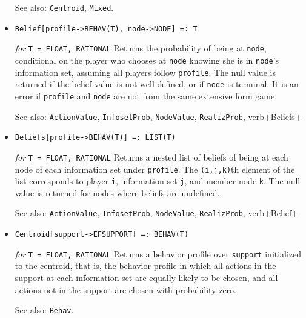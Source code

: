 \begin{itemize}
{\it for} {\tt T = FLOAT, RATIONAL}
\bd
Returns a behavior strategy profile over \verb+support+ with the
values specified by \verb+value+.  It is an error if the dimensions of
\verb+value+ do not match those of \verb+support+.
\item [See also:] \verb+Centroid+, \verb+Mixed+.
\ed

\item{}
\protect \large \begin{verbatim}
Belief[profile->BEHAV(T), node->NODE] =: T
\end{verbatim}\normalsize

{\it for} {\tt T = FLOAT, RATIONAL}
\bd
Returns the probability of being at \verb+node+, conditional on the
player who chooses at \verb+node+ knowing she is in \verb+node+'s
information set, assuming all players follow \verb+profile+.  The null
value is returned if the belief value is not well-defined, or if
\verb+node+ is terminal.  It is an error if \verb+profile+ and \verb+node+
are not from the same extensive form game.
\item [See also:] \verb+ActionValue+, \verb+InfosetProb+, \verb+NodeValue+,
\verb+RealizProb+, verb+Beliefs+
\ed

\item{}
\protect \large \begin{verbatim}
Beliefs[profile->BEHAV(T)] =: LIST(T)
\end{verbatim}\normalsize

{\it for} {\tt T = FLOAT, RATIONAL} 
\bd 
Returns a nested list of
beliefs of being at each node of each information set under
\verb+profile+. The \verb+(i,j,k)+th element of the list corresponds
to player \verb+i+, information set \verb+j+, and member node
\verb+k+. The null value is returned for nodes where beliefs are
undefined.

\item [See also:] \verb+ActionValue+, \verb+InfosetProb+, \verb+NodeValue+,
\verb+RealizProb+, verb+Belief+
\ed




\item{}
\protect \large \begin{verbatim} 
Centroid[support->EFSUPPORT] =: BEHAV(T)
\end{verbatim}\normalsize

{\it for} {\tt T = FLOAT, RATIONAL}
\bd
Returns a behavior profile over \verb+support+ initialized to the
centroid, that is, the behavior profile in which all actions in the
support at each information set are equally likely to be chosen, and
all actions not in the support are chosen with probability zero.
\item [See also:] \verb+Behav+.
\ed


\end{itemize}
